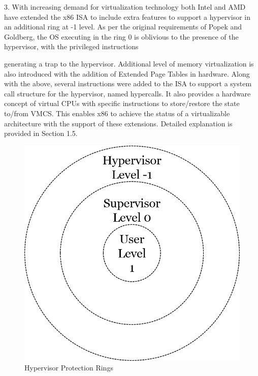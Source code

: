 3. With increasing demand for virtualization technology both Intel and AMD have extended the x86 ISA to include extra features to support a hypervisor in an additional ring at -1 level. As per the original requirements of Popek and Goldberg, the OS executing in the ring 0 is oblivious to the presence of the hypervisor, with the privileged instructions

generating a trap to the hypervisor. Additional level of memory virtualization is also introduced with the addition of Extended Page Tables in hardware. Along with the above, several instructions were added to the ISA to support a system call structure for the hypervisor, named hypercalls. It also provides a hardware concept of virtual CPUs with specific instructions to store/restore the state to/from VMCS. This enables x86 to achieve the status of a virtualizable architecture with the support of these extensions. Detailed explanation is provided in Section 1.5. 

\setlength{\belowcaptionskip}{-10pt}

\begin{figure}[H]
  \centering
  \includegraphics[scale=0.6]{figures/protect_hyper.png}
  \caption{Hypervisor Protection Rings}
  \label{fig:hyper_rings}
\end{figure}

